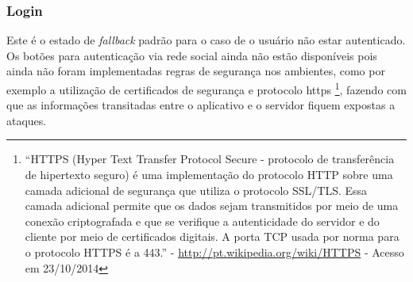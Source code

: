 \begin{table}[htb]
\end{table}

\subsubsection{Login}
Este é o estado de \textit{fallback} padrão para o caso de o usuário não estar autenticado. Os botões para autenticação via rede social ainda não estão disponíveis pois ainda não foram implementadas regras de segurança nos ambientes, como por exemplo a utilização de certificados de segurança e protocolo \gls{https}%
\footnote{``HTTPS (Hyper Text Transfer Protocol Secure - protocolo de transferência de hipertexto seguro) é uma implementação do protocolo HTTP sobre uma camada adicional de segurança que utiliza o protocolo SSL/TLS. Essa camada adicional permite que os dados sejam transmitidos por meio de uma conexão criptografada e que se verifique a autenticidade do servidor e do cliente por meio de certificados digitais. A porta TCP usada por norma para o protocolo HTTPS é a 443.'' - \url{http://pt.wikipedia.org/wiki/HTTPS} - Acesso em 23/10/2014},
fazendo com que as informações transitadas entre o aplicativo e o servidor fiquem expostas a ataques.

